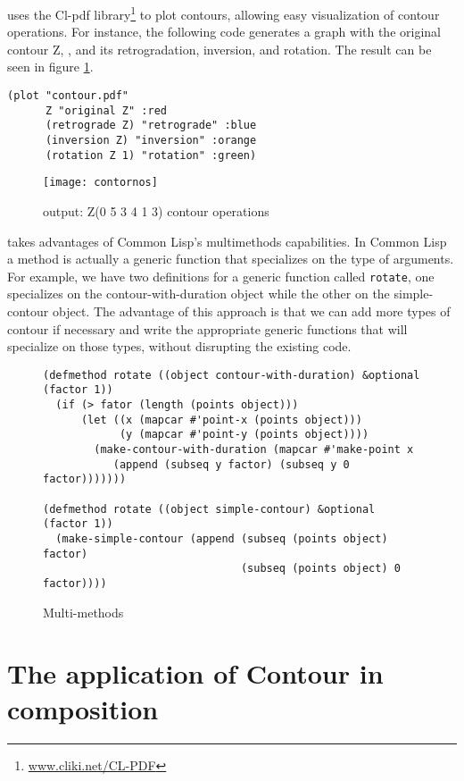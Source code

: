 \goiaba{} uses the Cl-pdf library\footnote{\url{www.cliki.net/CL-PDF}}
to plot contours, allowing easy visualization of contour operations.
For instance, the following code generates a graph with the original
contour Z, , and its retrogradation, inversion,
and rotation. The result can be seen in figure \ref{fig:operacoes}.

\begin{verbatim}
(plot "contour.pdf"
      Z "original Z" :red
      (retrograde Z) "retrograde" :blue
      (inversion Z) "inversion" :orange
      (rotation Z 1) "rotation" :green)
\end{verbatim}

\begin{figure}
  \centering
  \texttt{[image: contornos]}
  \caption{\goiaba{} output: Z(0 5 3 4 1 3) contour operations}
  \label{fig:operacoes}
\end{figure}

\goiaba{} takes advantages of Common Lisp's multimethods capabilities.
In Common Lisp a method is actually a generic function that
specializes on the type of arguments. For example, we have two
definitions for a generic function called \texttt{rotate}, one
specializes on the contour-with-duration object while the other on the
simple-contour object. The advantage of this approach is that we can
add more types of contour if necessary and write the appropriate
generic functions that will specialize on those types, without
disrupting the existing code.

\begin{figure*}
\begin{verbatim}
(defmethod rotate ((object contour-with-duration) &optional (factor 1))
  (if (> fator (length (points object)))
      (let ((x (mapcar #'point-x (points object)))
            (y (mapcar #'point-y (points object))))
        (make-contour-with-duration (mapcar #'make-point x
           (append (subseq y factor) (subseq y 0 factor)))))))

(defmethod rotate ((object simple-contour) &optional (factor 1))
  (make-simple-contour (append (subseq (points object) factor)
                               (subseq (points object) 0 factor))))
\end{verbatim}
  \caption{Multi-methods}
  \label{fig:code-methods}
\end{figure*}

\section{The application of Contour in composition}
\label{sec:cont-appl-comp}

